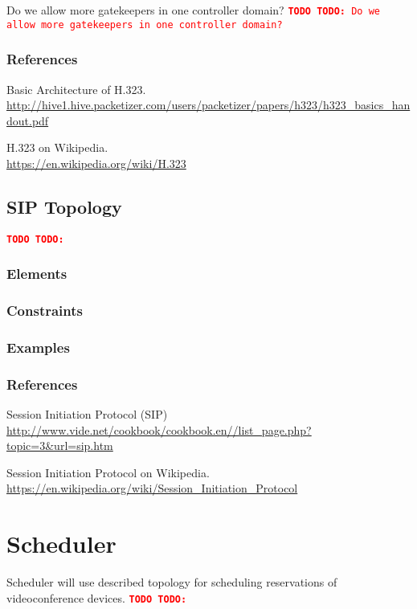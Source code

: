 \documentclass[a4paper]{report}
\newcommand{\TODO}[1]{%
\def\empty{}%
\def\prvniparametr{#1}%
\ifx\prvniparametr\empty%
\begingroup\tt\textcolor{red}{\noindent\textbf{TODO}}\endgroup
\else%
\begingroup\tt\textcolor{red}{\noindent\textbf{TODO:}\ #1}\endgroup
\fi%
}
\begin{document}
\TODO{Do we allow more gatekeepers in one controller domain?}


\subsection{References}

\renewcommand{\bibsection}{}
\begin{thebibliography}{1}

Basic Architecture of H.323.
\\ \url{http://hive1.hive.packetizer.com/users/packetizer/papers/h323/h323_basics_handout.pdf}

H.323 on Wikipedia.
\\ \url{https://en.wikipedia.org/wiki/H.323}

\end{thebibliography}


\section{SIP Topology}

\TODO{}

\subsection{Elements}

\subsection{Constraints}

\subsection{Examples}

\subsection{References}

\renewcommand{\bibsection}{}
\begin{thebibliography}{1}

Session Initiation Protocol (SIP)
\\ \url{http://www.vide.net/cookbook/cookbook.en//list_page.php?topic=3&url=sip.htm}

Session Initiation Protocol on Wikipedia.
\\ \url{https://en.wikipedia.org/wiki/Session_Initiation_Protocol}

\end{thebibliography}


\chapter{Scheduler}

Scheduler will use described topology for scheduling reservations of videoconference devices.
\TODO{}
\end{document}
